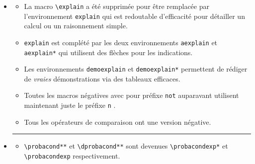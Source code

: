 \documentclass[12pt,a4paper]{book}
\makeatletter
\newcommand\env[1]{\texttt{#1}}
\newcommand\macro[1]{\env{\textbackslash{}#1}}
\theoremstyle{definition}
\newcommand\separation{
	\medskip
	\hfill\rule{0.5\textwidth}{0.75pt}\hfill
	\medskip
}
\newcommand\prefix[1]{%
	\texttt{#1}%
}
\newcommand\topic{\@ifstar{\@topic@star}{\@topic@no@star}}
\newcommand\@topic@no@star[1]{%
	\textbf{\textsc{#1}.}%
}
\newcommand\@topic@star[1]{%
	\textbf{\textsc{#1} :}%
}
\makeatother
\begin{document}
{{\begin{description}
\begin{itemize}[itemsep=.5em]
\begin{itemize}[itemsep=.5em]
    
    
            \item Norme.
            
            \begin{itemize}[itemsep=.5em, label=$\rightarrow$]
                \item \macro{norm} fonctionne maintenant avec des options.
                      Du coup \macro{norm*} a été supprimée mais la mise en forme correspondante existe toujours via \macro{norm[s]}.
    
    			\item \macro{vnorm} évite d'avoir à utiliser \macro{vect} pour des vecteurs juste nommés.
    	    \end{itemize}
        \end{itemize}
    
    
    
    
        \separation
        \item \topic{Logique}
        \begin{itemize}[itemsep=.5em]
            \item La macro \macro{explain} a été supprimée pour être remplacée par l'environnement \env{explain} qui est redoutable d'efficacité pour détailler un calcul ou un raisonnement simple.
            
            \item \env{explain} est complété par les deux environnements \env{aexplain} et \env{aexplain*} qui utilisent des flèches pour les indications.
    
            \item Les environnements \env{demoexplain} et \env{demoexplain*} permettent de rédiger de \emph{\og vraies \fg} démonstrations via des tableaux efficaces.
    
            \item Toutes les macros négatives avec pour préfixe \prefix{not} auparavant utilisent maintenant juste le préfixe \prefix{n}.
    
            \item Tous les opérateurs de comparaison ont une version négative.
        \end{itemize}
    
    
    
    
        \separation
        \item \topic{Probabilités}
        \begin{itemize}[itemsep=.5em]
            \item \macro{probacond**} et \macro{dprobacond**} sont devenues \macro{probacondexp*} et \macro{probacondexp} respectivement.
            

\end{itemize}
\end{itemize}
\end{description}}}
\end{document}
